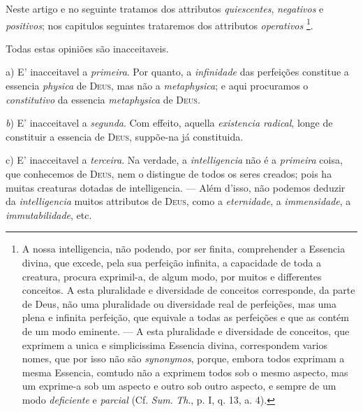 Neste artigo e no seguinte tratamos dos attributos \emph{quiescentes}, \emph{negativos} e \emph{positivos}; nos capitulos seguintes trataremos dos attributos \emph{operativos} \footnote{A nossa intelligencia, não podendo, por ser finita, comprehender a Essencia divina, que excede, pela sua perfeição infinita, a capacidade de toda a creatura, procura exprimil-a, de algum modo, por muitos e differentes conceitos. A esta pluralidade e diversidade de conceitos corresponde, da parte de Deus, não uma pluralidade ou diversidade real de perfeições, mas uma plena e infinita perfeição, que equivale a todas as perfeições e que as contém de um modo eminente. --- A esta pluralidade e diversidade de conceitos, que exprimem a unica e simplicissima Essencia divina, correspondem varios nomes, que por isso não são \emph{synonymos}, porque, embora todos exprimam a mesma Essencia, comtudo não a exprimem todos sob o mesmo aspecto, mas um exprime-a sob um aspecto e outro sob outro aspecto, e sempre de um modo \emph{deficiente} e \emph{parcial} (Cf. \emph{Sum}. \emph{Th}., p. I, q. 13, a. 4).}.

Todas estas opiniões são inacceitaveis.

a) E' inacceitavel a \emph{primeira}. Por quanto, a \emph{infinidade} das perfeições constitue a essencia \emph{physica} de \textsc{Deus}, mas não a \emph{metaphysica}; e aqui procuramos o \emph{constitutivo} da essencia \emph{metaphysica} de \textsc{Deus}.

\emph{b}) E' inacceitavel a \emph{segunda}. Com effeito, aquella \emph{existencia radical}, longe de constituir a essencia de \textsc{Deus}, suppõe-na já constituida.

c) E' inacceitavel a \emph{terceira}. Na verdade, a \emph{intelligencia} não é a \emph{primeira} coisa, que conhecemos de \textsc{Deus}, nem o distingue de todos os seres creados; pois ha muitas creaturas dotadas de intelligencia. --- Além d'isso, não podemos deduzir da \emph{intelligencia} muitos attributos de \textsc{Deus}, como a \emph{eternidade}, a \emph{immensidade}, a \emph{immutabilidade}, etc.

